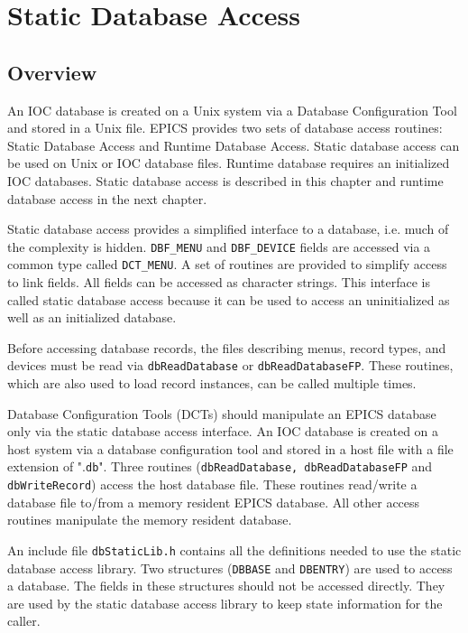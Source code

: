 





\chapter{Static Database Access}

\section{Overview}

An IOC database is created on a Unix system via a Database Configuration Tool and stored in a Unix file. EPICS provides 
two sets of database access routines: Static Database Access and Runtime Database Access. Static database access can be 
used on Unix or IOC database files. Runtime database requires an initialized IOC databases. Static database access is 
described in this chapter and runtime database access in the next chapter.

Static database access provides a simplified interface to a database, i.e. much of the complexity is hidden. \verb|DBF_MENU| and 
\verb|DBF_DEVICE| fields are accessed via a common type called \verb|DCT_MENU|. A set of routines are provided to simplify access 
to link fields. All fields can be accessed as character strings. This interface is called static database access because it can 
be used to access an uninitialized as well as an initialized database.

Before accessing database records, the files describing menus, record types, and devices must be read via 
\verb|dbReadDatabase| or \verb|dbReadDatabaseFP|. These routines, which are also used to load record instances, can be 
called multiple times.

Database Configuration Tools (DCTs) should manipulate an EPICS database only via the static database access interface. 
An IOC database is created on a host system via a database configuration tool and stored in a host file with a file 
extension of ".\verb|db|". Three routines (\verb|dbReadDatabase, dbReadDatabaseFP| and \verb|dbWriteRecord|) access the 
host database file. These routines read/write a database file to/from a memory resident EPICS database. All other access 
routines manipulate the memory resident database.

An include file \verb|dbStaticLib.h| contains all the definitions needed to use the static database access library. Two 
structures (\verb|DBBASE| and \verb|DBENTRY|) are used to access a database. The fields in these structures should not be accessed 
directly. They are used by the static database access library to keep state information for the caller.

